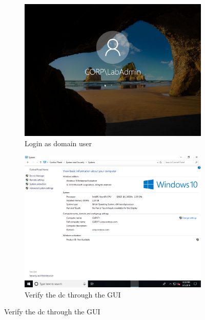 \begin{figure}[h]
	\begin{subfigure}{0.5\textwidth}
		\captionsetup{width=0.8\linewidth}
		\includegraphics[width=0.9\linewidth]{img/Methodologie/Prerequisites1.png}
		\centering
		\caption{Login as domain user}
		\label{fig:migration0}
	\end{subfigure}
	\begin{subfigure}{0.5\textwidth}
		\captionsetup{width=0.8\linewidth}
		\includegraphics[width=0.9\linewidth]{img/Methodologie/Prerequisites2.png} 
		\centering
		\caption{Verify the \acrshort{dc} through the GUI}
		\label{fig:migration1}
	\end{subfigure}
\end{figure}
